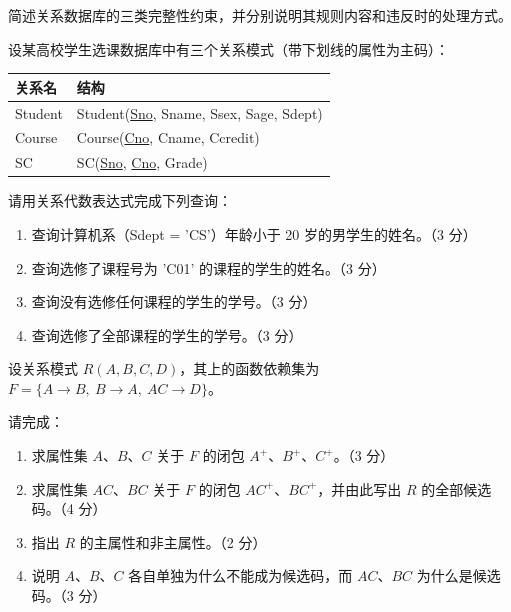 \documentclass[a4paper,11pt]{article}
\begin{document}
\q 简述关系数据库的三类完整性约束，并分别说明其规则内容和违反时的处理方式。\anslines{2.2cm}

\q 设某高校学生选课数据库中有三个关系模式（带下划线的属性为主码）：
\begin{center}
\begin{tabular}{@{}ll@{}}
\toprule
关系名 & 结构 \\
\midrule
Student & Student(\underline{Sno}, Sname, Ssex, Sage, Sdept) \\
Course & Course(\underline{Cno}, Cname, Ccredit) \\
SC & SC(\underline{Sno}, \underline{Cno}, Grade) \\
\bottomrule
\end{tabular}
\end{center}

请用关系代数表达式完成下列查询：
\begin{enumerate}[label=（\arabic*）, leftmargin=2.4em, itemsep=1pt]
  \item 查询计算机系（Sdept = 'CS'）年龄小于 20 岁的男学生的姓名。（3 分）
  \item 查询选修了课程号为 'C01' 的课程的学生的姓名。（3 分）
  \item 查询没有选修任何课程的学生的学号。（3 分）
  \item 查询选修了全部课程的学生的学号。（3 分）
\end{enumerate}
\anslines{4.5cm}

\q 设关系模式 $R(A,B,C,D)$，其上的函数依赖集为 $F=\{A\to B,\ B\to A,\ AC\to D\}$。

请完成：
\begin{enumerate}[label=（\arabic*）, leftmargin=2.4em, itemsep=1pt]
  \item 求属性集 $A$、$B$、$C$ 关于 $F$ 的闭包 $A^{+}$、$B^{+}$、$C^{+}$。（3 分）
  \item 求属性集 $AC$、$BC$ 关于 $F$ 的闭包 $AC^{+}$、$BC^{+}$，并由此写出 $R$ 的全部候选码。（4 分）
  \item 指出 $R$ 的主属性和非主属性。（2 分）
  \item 说明 $A$、$B$、$C$ 各自单独为什么不能成为候选码，而 $AC$、$BC$ 为什么是候选码。（3 分）
\end{enumerate}
\anslines{4.5cm}
\end{document}
